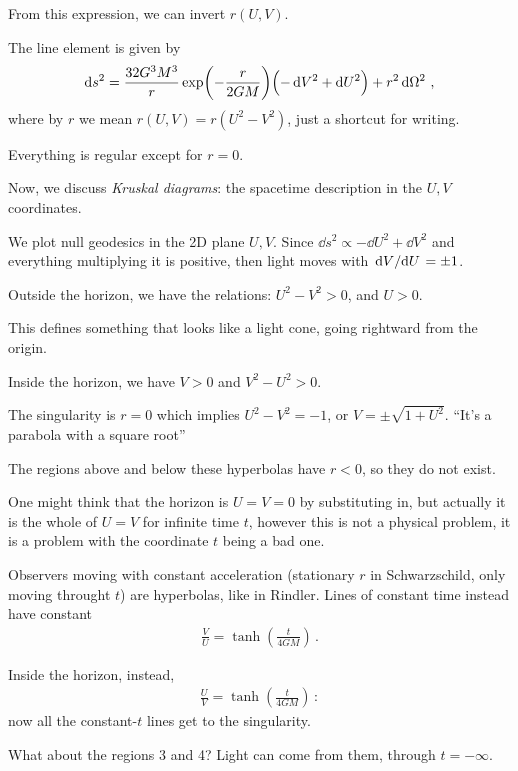 \documentclass[main.tex]{subfiles}
\begin{document}
From this expression, we can invert \(r ( U, V)\). 

The line element is given by 
%
\begin{align}
  \dd{s^2} = \frac{32G^3M^3}{r} \exp(-\frac{r}{2GM})
  \qty(- \dd{V^2} + \dd{U^2}) + r^2 \dd{\Omega^2}
\,,
\end{align}
%
where by \(r\) we mean \(r(U,V) = r(U^2-V^2)\), just a shortcut for writing.

Everything is regular except for \(r=0\). 

Now, we discuss \emph{Kruskal diagrams}: the spacetime description in the \(U, V\) coordinates. 

We plot null geodesics in the 2D plane \(U, V\). 
Since \(\dd{s^2} \propto - \dd{U^2} + \dd{V^2}\) and everything multiplying it is positive, then light moves with \( \dv*{V}{U} = \pm 1\). 

Outside the horizon, we have the relations: \(U^2-V^2>0\), and \(U>0\). 

This defines something that looks like a light cone, going rightward from the origin. 

Inside the horizon, we have \(V>0\) and \(V^2-U^2>0\). 

The singularity is \(r=0\) which implies \(U^2- V^2 = -1\), or \(V = \pm \sqrt{1 + U^2}\). 
``It's a parabola with a square root'' 

The regions above and below these hyperbolas have \(r<0\), so they do not exist. 

One might think that the horizon is \(U = V = 0\) by substituting in, but actually it is the whole of \(U = V\) for infinite time \(t\), however this is not a physical problem, it is a problem with the coordinate \(t\) being a bad one. 

Observers moving with constant acceleration (stationary \(r\) in Schwarzschild, only moving throught \(t\)) are hyperbolas, like in Rindler. Lines of constant time instead have constant 
%
\begin{align}
  \frac{V}{U} = \tanh(\frac{t}{4GM})
\,.
\end{align}

Inside the horizon, instead, 
 \begin{align}
   \frac{U}{V} = \tanh(\frac{t}{4GM})
 \,:
 \end{align}
now all the constant-\(t\) lines get to the singularity. 

What about the regions 3 and 4? Light can come from them, through \(t = - \infty\). 
\end{document}
